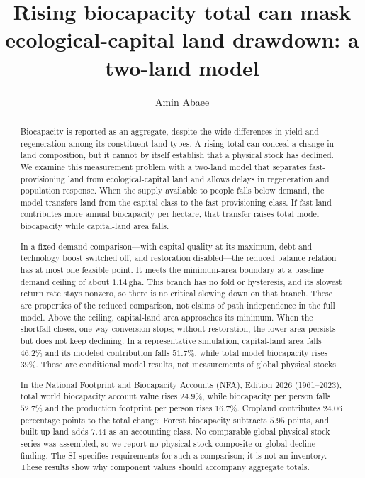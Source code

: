 \documentclass[preprint,12pt,authoryear]{elsarticle}
\begin{document}
\begin{frontmatter}

\title{Rising biocapacity total can mask ecological-capital land drawdown: a two-land model}

\author[1]{Amin Abaee}

\begin{abstract}
\footnotesize
Biocapacity is reported as an aggregate, despite the wide differences in yield and regeneration among its constituent land types. A rising total can conceal a change in land composition, but it cannot by itself establish that a physical stock has declined. We examine this measurement problem with a two-land model that separates fast-provisioning land from ecological-capital land and allows delays in regeneration and population response. When the supply available to people falls below demand, the model transfers land from the capital class to the fast-provisioning class. If fast land contributes more annual biocapacity per hectare, that transfer raises total model biocapacity while capital-land area falls.

In a fixed-demand comparison—with capital quality at its maximum, debt and technology boost switched off, and restoration disabled—the reduced balance relation has at most one feasible point. It meets the minimum-area boundary at a baseline demand ceiling of about $1.14$\,gha. This branch has no fold or hysteresis, and its slowest return rate stays nonzero, so there is no critical slowing down on that branch. These are properties of the reduced comparison, not claims of path independence in the full model. Above the ceiling, capital-land area approaches its minimum. When the shortfall closes, one-way conversion stops; without restoration, the lower area persists but does not keep declining. In a representative simulation, capital-land area falls $46.2\%$ and its modeled contribution falls $51.7\%$, while total model biocapacity rises $39\%$. These are conditional model results, not measurements of global physical stocks.

In the National Footprint and Biocapacity Accounts (NFA), Edition 2026 (1961--2023), total world biocapacity account value rises $24.9\%$, while biocapacity per person falls $52.7\%$ and the production footprint per person rises $16.7\%$. Cropland contributes $24.06$ percentage points to the total change; Forest biocapacity subtracts $5.95$ points, and built-up land adds $7.44$ as an accounting class. No comparable global physical-stock series was assembled, so we report no physical-stock composite or global decline finding. The SI specifies requirements for such a comparison; it is not an inventory. These results show why component values should accompany aggregate totals.
\end{abstract}


\end{frontmatter}
\end{document}
